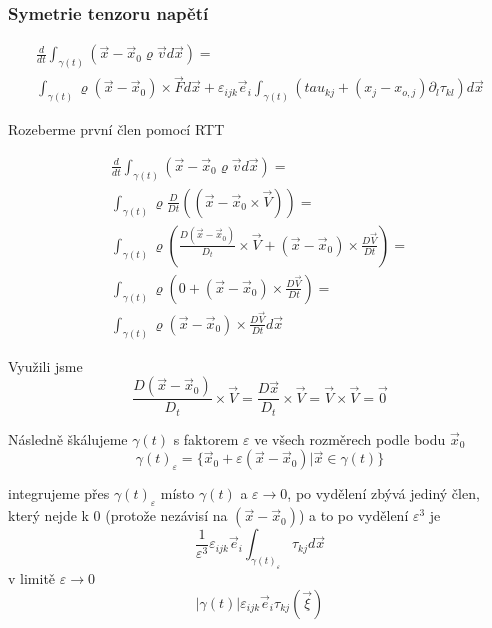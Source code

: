 \documentclass[../main.tex]{subfiles}
\begin{document}
\subsubsection{Symetrie tenzoru napětí}

\begin{multline}
    \frac{d}{dt}\int_{\gamma(t)} (\vec{x} - \vec{x}_0 \varrho \vec{v} d\vec{x}) =\\
    \int_{\gamma(t)} \varrho (\vec{x}-\vec{x}_0) \times \vec{F} d\vec{x} + 
    \varepsilon_{ijk} \vec{e}_i \int_{\gamma(t)} (tau_{kj} + (x_j - x_{o,j}) \partial_l \tau_{kl}) d\vec{x}
\end{multline}

Rozeberme první člen pomocí RTT

\begin{multline}
    \frac{d}{dt}\int_{\gamma(t)} (\vec{x} - \vec{x}_0 \varrho \vec{v} d\vec{x}) =\\
    \int_{\gamma(t)} \varrho \frac{D}{Dt} ((\vec{x} - \vec{x}_0 \times \vec{V}))=\\
    \int_{\gamma(t)} \varrho \left( \frac{D (\vec{x} - \vec{x}_0)}{D_t}\times \vec{V} + (\vec{x} - \vec{x}_0) \times \frac{D\vec{V}}{Dt} \right) =\\
    \int_{\gamma(t)} \varrho \left( 0 + (\vec{x} - \vec{x}_0) \times \frac{D\vec{V}}{Dt} \right) =\\
    \int_{\gamma(t)} \varrho (\vec{x} - \vec{x}_0) \times \frac{D\vec{V}}{Dt} d\vec{x}
\end{multline}

Využili jsme
\begin{equation*}
    \frac{D (\vec{x} - \vec{x}_0)}{D_t}\times \vec{V} =     \frac{D \vec{x} }{D_t}\times \vec{V} =
    \vec{V} \times \vec{V} = \vec{0} 
\end{equation*}



Následně škálujeme $\gamma(t)$ s faktorem $\varepsilon$ ve všech rozměrech podle bodu $\vec{x}_0$
\begin{equation}
    \gamma(t)_\varepsilon = \{ \vec{x}_0 + \varepsilon(\vec{x} - \vec{x}_0) | \vec{x} \in \gamma(t) \}
\end{equation}

integrujeme přes $\gamma(t)_\varepsilon$ místo $\gamma(t)$ a $\varepsilon \rightarrow 0$, po vydělení zbývá jediný člen,
který nejde k 0 (protože nezávisí na $(\vec{x} - \vec{x}_0)$) a to po vydělení $\varepsilon^3$ je
\begin{equation}
    \frac{1}{\varepsilon^3} \varepsilon_{ijk} \vec{e}_i \int_{\gamma(t)_\varepsilon} \tau_{kj} d\vec{x}
\end{equation}
v limitě $\varepsilon \rightarrow 0$
\begin{equation}
    |\gamma(t)|\varepsilon_{ijk} \vec{e}_i \tau_{kj} (\vec{\xi})
\end{equation}
\end{document}
